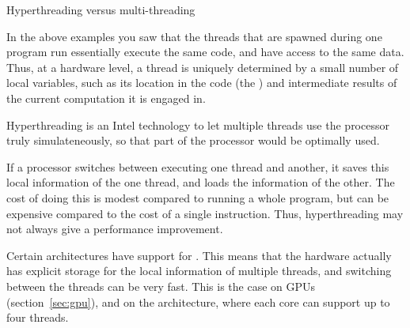  {Hyperthreading versus multi-threading}
\label{sec:hyperthread}

In the above examples you saw that the threads that are spawned during one 
program run essentially execute the same code, and have access to the same data.
Thus, at a hardware level, a thread is uniquely determined by a small number of
local variables, such as its location in the code (the )
and intermediate results of the current computation it is engaged in.

Hyperthreading is an Intel technology to let multiple threads use the
processor truly simulateneously, so that part of the processor would
be optimally used.

If a processor switches between executing one thread and another, it saves this
local information of the one thread, and loads the information of the other.
The cost of doing this is modest compared to running a whole program, but 
can be expensive compared to the cost of a single instruction. Thus,
hyperthreading may not always give a performance improvement.

Certain architectures have support
for . This means that the hardware actually
has explicit storage for the local information of multiple threads,
and switching between the threads can be very fast. This is the case
on \acp{GPU} (section~\ref{sec:gpu}), and on
the  architecture, where each core can
support up to four threads.

